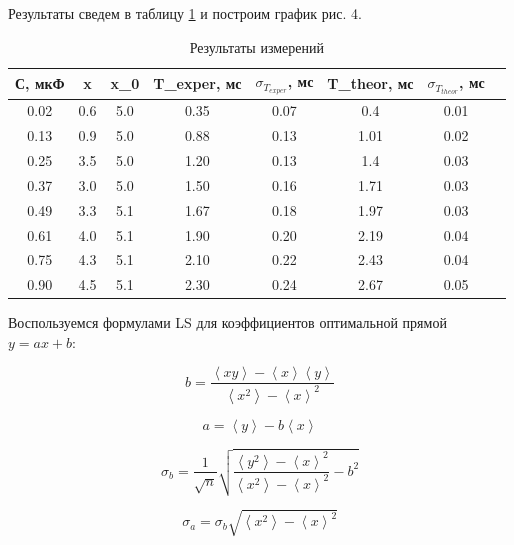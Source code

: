 \documentclass[a4paper,12pt]{article}
\begin{document}
Результаты сведем в таблицу \ref{resT} и построим график рис. 4. 

\begin{table}[h!]
	\centering
	\caption{Результаты измерений}
	\begin{tabular}{|c|c|c|c|c|c|c|c|}
		\hline
		С, мкФ & x & x_0 & T_{exper}, мс & $\sigma_{T_{exper}}$, мс & T_{theor}, мс & $ \sigma_{T_{theor}} $, мс \\
		\hline
		0.02 & 0.6 & 5.0 & 0.35 & 0.07 & 0.4 & 0.01 \\
		0.13 & 0.9 & 5.0 & 0.88 & 0.13 & 1.01 & 0.02 \\
		0.25 & 3.5 & 5.0 & 1.20 & 0.13 & 1.4 & 0.03 \\
		0.37 & 3.0 & 5.0 & 1.50 & 0.16 & 1.71 & 0.03 \\
		0.49 & 3.3 & 5.1 & 1.67 & 0.18 & 1.97 & 0.03 \\
		0.61 & 4.0 & 5.1 & 1.90 & 0.20 & 2.19 & 0.04 \\
		0.75 & 4.3 & 5.1 & 2.10 & 0.22 & 2.43 & 0.04 \\
		0.90 & 4.5 & 5.1 & 2.30 & 0.24 & 2.67 & 0.05 \\
		\hline
	\end{tabular}%
\label{resT}%
\end{table}%

Воспользуемся формулами LS для коэффициентов оптимальной прямой $y = ax + b$:


\begin{equation}\label{}
b = \frac{\left\langle{xy}\right\rangle - \left\langle{x}\right\rangle \left\langle{y}\right\rangle}{\left\langle{x^2}\right\rangle - \left\langle{x}\right\rangle^2}
\end{equation}

\begin{equation}\label{}
a = \left\langle{y}\right\rangle - b\left\langle{x}\right\rangle
\end{equation}

\begin{equation}\label{}
\sigma_{b} = \frac{1}{\sqrt{n}}\sqrt{\frac{\left\langle{y^2}\right\rangle - \left\langle{x}\right\rangle^2}{\left\langle{x^2}\right\rangle - \left\langle{x}\right\rangle^2} - b^2}
\end{equation}

\begin{equation}\label{}
\sigma_{a} = \sigma_{b}\sqrt{\left\langle{x^2}\right\rangle - \left\langle{x}\right\rangle^2}
\end{equation}
\end{document}
